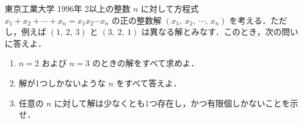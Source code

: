 \documentclass[a4paper]{ltjsarticle}
\begin{document}

\begin{itembox}[l]{東京工業大学 1996年}
    2以上の整数 $n$ に対して方程式 $x_1+x_2+\cdots+x_n=x_{1}x_{2}\cdots x_{n}$ の正の整数解 $(x_1,\ x_2,\ \cdots,\ x_n)$ を考える．ただし，例えば $(1,\ 2,\ 3)$ と $(3,\ 2,\ 1)$ は異なる解とみなす．このとき，次の問いに答えよ．

    \begin{enumerate}[label=(\arabic*)]
        \item $n=2$ および $n=3$ のときの解をすべて求めよ．

        \item 解が1つしかないような $n$ をすべて答えよ．

        \item 任意の $n$ に対して解は少なくとも1つ存在し，かつ有限個しかないことを示せ．
    \end{enumerate}
\end{itembox}
\end{document}
